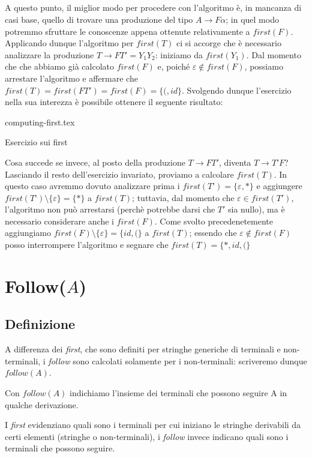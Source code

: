 \documentclass[class=book, crop=false, oneside, 12pt]{standalone}
\begin{document}
\subparagraph{}
A questo punto, il miglior modo per procedere con l'algoritmo è, in mancanza di casi base, quello di trovare una produzione del tipo \(A \rightarrow F\alpha\); in quel modo potremmo sfruttare le conoscenze appena ottenute relativamente a \(first(F)\). Applicando dunque l'algoritmo per \(first(T)\) ci si accorge che è necessario analizzare la produzione \(T \rightarrow FT' = Y_1Y_2\): iniziamo da \(first(Y_1)\). Dal momento che che abbiamo già calcolato \(first(F)\) e, poiché \(\varepsilon \notin first(F)\), possiamo arrestare l'algoritmo e affermare che \(first(T) = first(FT') = first(F) = \{(, id\}\). Svolgendo dunque l'esercizio nella sua interezza è possibile ottenere il seguente risultato:
\begin{table}[H]
	\centering
	{computing-first.tex}
    \caption{Esercizio sui first}
    \label{computing-first}
\end{table}
Cosa succede se invece, al posto della produzione \(T \to FT'\), diventa \(T \to T’F\)? Lasciando il resto dell'esercizio invariato, proviamo a calcolare \(first(T)\). In questo caso avremmo dovuto analizzare prima i \(first(T’) = \{\varepsilon, \ast\}\) e aggiungere \(first(T’) \setminus \{\varepsilon\} = \{\ast\}\) a \(first(T)\); tuttavia, dal momento che \(\varepsilon \in first(T')\), l’algoritmo non può arrestarsi (perchè potrebbe darsi che \(T'\) sia nullo), ma è necessario considerare anche i \(first(F)\). Come svolto precedenetemente aggiungiamo \(first(F) \setminus \{\varepsilon\} = \{id, (\}\) a \(first(T)\); essendo che \(\varepsilon \notin first(F)\) posso interrompere l'algoritmo e segnare che \(first(T) = \{\ast, id, (\}\)

\section{Follow(\(A\))}
\subsection{Definizione}
A differenza dei \emph{first}, che sono definiti per stringhe generiche di terminali e non-terminali, i \emph{follow} sono calcolati solamente per i non-terminali: scriveremo dunque \(follow(A)\).
\begin{definition}
    Con \(follow(A)\) indichiamo l'insieme dei terminali che possono seguire A in qualche derivazione.    
\end{definition}
I \emph{first} evidenziano quali sono i terminali per cui iniziano le stringhe derivabili da certi elementi (stringhe o non-terminali), i \emph{follow} invece indicano quali sono i terminali che possono seguire.
\end{document}
